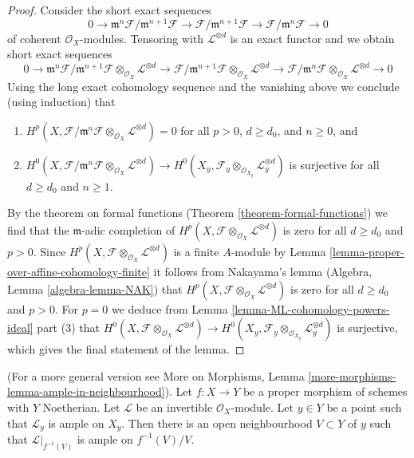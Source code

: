 \begin{proof}
\medskip\noindent
Consider the short exact sequences
$$
0 \to \mathfrak m^n\mathcal{F}/\mathfrak m^{n + 1} \mathcal{F}
\to \mathcal{F}/\mathfrak m^{n + 1} \mathcal{F}
\to \mathcal{F}/\mathfrak m^n \mathcal{F} \to 0
$$
of coherent $\mathcal{O}_X$-modules. Tensoring with $\mathcal{L}^{\otimes d}$
is an exact functor and we obtain short exact sequences
$$
0 \to
\mathfrak m^n\mathcal{F}/\mathfrak m^{n + 1} \mathcal{F}
\otimes_{\mathcal{O}_X} \mathcal{L}^{\otimes d}
\to \mathcal{F}/\mathfrak m^{n + 1} \mathcal{F}
\otimes_{\mathcal{O}_X} \mathcal{L}^{\otimes d}
\to \mathcal{F}/\mathfrak m^n \mathcal{F}
\otimes_{\mathcal{O}_X} \mathcal{L}^{\otimes d} \to 0
$$
Using the long exact cohomology sequence and the vanishing above
we conclude (using induction) that
\begin{enumerate}
\item $H^p(X, \mathcal{F}/\mathfrak m^n \mathcal{F}
\otimes_{\mathcal{O}_X} \mathcal{L}^{\otimes d}) = 0$
for all $p > 0$, $d \geq d_0$, and $n \geq 0$, and
\item $H^0(X, \mathcal{F}/\mathfrak m^n \mathcal{F}
\otimes_{\mathcal{O}_X} \mathcal{L}^{\otimes d}) \to
H^0(X_y, \mathcal{F}_y \otimes_{\mathcal{O}_{X_y}} \mathcal{L}_y^{\otimes d})$
is surjective for all $d \geq d_0$ and $n \geq 1$.
\end{enumerate}
By the theorem on formal functions (Theorem \ref{theorem-formal-functions})
we find that the $\mathfrak m$-adic completion of
$H^p(X, \mathcal{F} \otimes_{\mathcal{O}_X} \mathcal{L}^{\otimes d})$
is zero for all $d \geq d_0$ and $p > 0$.
Since $H^p(X, \mathcal{F} \otimes_{\mathcal{O}_X} \mathcal{L}^{\otimes d})$
is a finite $A$-module by
Lemma \ref{lemma-proper-over-affine-cohomology-finite}
it follows from Nakayama's lemma (Algebra, Lemma \ref{algebra-lemma-NAK})
that $H^p(X, \mathcal{F} \otimes_{\mathcal{O}_X} \mathcal{L}^{\otimes d})$
is zero for all $d \geq d_0$ and $p > 0$.
For $p = 0$ we deduce from
Lemma \ref{lemma-ML-cohomology-powers-ideal} part (3)
that $H^0(X, \mathcal{F} \otimes_{\mathcal{O}_X} \mathcal{L}^{\otimes d}) \to
H^0(X_y, \mathcal{F}_y \otimes_{\mathcal{O}_{X_y}} \mathcal{L}_y^{\otimes d})$
is surjective, which gives the final statement of the lemma.
\end{proof}

\begin{lemma}
\label{lemma-ample-in-neighbourhood}
(For a more general version see
More on Morphisms,
Lemma \ref{more-morphisms-lemma-ample-in-neighbourhood}).
Let $f : X \to Y$ be a proper morphism of schemes with $Y$ Noetherian.
Let $\mathcal{L}$ be an invertible $\mathcal{O}_X$-module.
Let $y \in Y$ be a point such that $\mathcal{L}_y$ is ample
on $X_y$. Then there is an open neighbourhood $V \subset Y$
of $y$ such that $\mathcal{L}|_{f^{-1}(V)}$ is ample on $f^{-1}(V)/V$.
\end{lemma}

